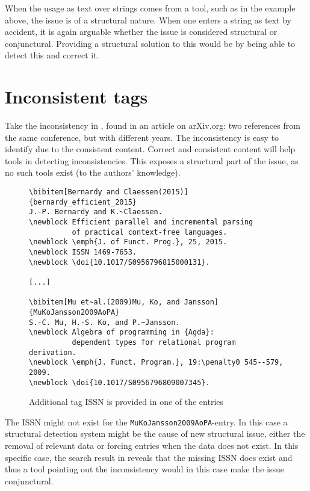 When the usage as text over strings comes from a tool, such as in the
example above, the issue is of a structural nature.  When one enters a
string as text by accident, it is again arguable whether the issue is
considered structural or conjunctural.  Providing a structural
solution to this would be by being able to detect this and correct it.


\section{Inconsistent tags}
\label{sec:problems_inconsistent_tags}

Take the inconsistency in , found in an
article on arXiv.org: two references from the same conference, but
with different years.  The inconsistency is easy to identify due to
the consistent content.  Correct and consistent content will help
tools in detecting inconsistencies.  This exposes a structural part of
the issue, as no such tools exist (to the authors' knowledge).

\begin{figure}
  \centering
  \begin{small}
\begin{verbatim}
\bibitem[Bernardy and Claessen(2015)]{bernardy_efficient_2015}
J.-P. Bernardy and K.~Claessen.
\newblock Efficient parallel and incremental parsing
          of practical context-free languages.
\newblock \emph{J. of Funct. Prog.}, 25, 2015.
\newblock ISSN 1469-7653.
\newblock \doi{10.1017/S0956796815000131}.

[...]

\bibitem[Mu et~al.(2009)Mu, Ko, and Jansson]{MuKoJansson2009AoPA}
S.-C. Mu, H.-S. Ko, and P.~Jansson.
\newblock Algebra of programming in {Agda}:
          dependent types for relational program derivation.
\newblock \emph{J. Funct. Program.}, 19:\penalty0 545--579, 2009.
\newblock \doi{10.1017/S0956796809007345}.
\end{verbatim}
  \end{small}
  \caption{Additional tag ISSN is provided in one of the entries}
\label{fig:entry_with_issn}
\end{figure}

The ISSN might not exist for the \texttt{MuKoJansson2009AoPA}-entry.
In this case a structural detection system might be the cause of new
structural issue, either the removal of relevant data or forcing
entries when the data does not exist.  In this specific case, the
search result in  reveals that the
missing ISSN does exist and thus a tool pointing out the inconsistency
would in this case make the issue conjunctural.

